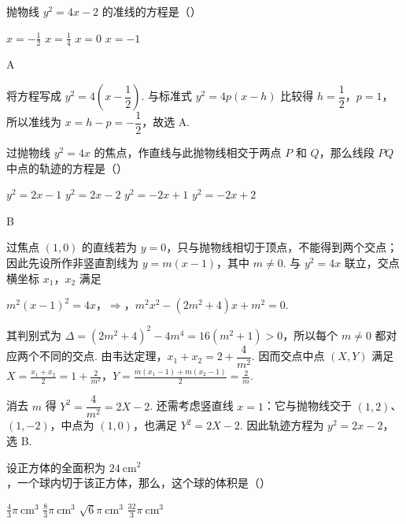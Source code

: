 \documentclass[UTF8,a4paper,oneside,11pt]{ctexbook}
\begin{document}
\begin{problem}
抛物线 \(y^2 = 4x - 2\) 的准线的方程是（\quad）

\choices
    {\(x = -\frac{1}{2}\)}
    {\(x = \frac{1}{4}\)}
    {\(x = 0\)}
    {\(x = -1\)}
\end{problem}

\begin{answer}
A
\end{answer}

\begin{solution}
将方程写成 \(y^2=4\left(x-\dfrac12\right)\). 与标准式 \(y^2=4p(x-h)\) 比较得 \(h=\dfrac12\)，\(p=1\)，所以准线为 \(x=h-p=-\dfrac12\)，故选 A.
\end{solution}

\begin{problem}
过抛物线 \(y^2 = 4x\) 的焦点，作直线与此抛物线相交于两点 \(P\) 和 \(Q\)，那么线段 \(PQ\) 中点的轨迹的方程是（\quad）

\choices
    {\(y^2 = 2x - 1\)}
    {\(y^2 = 2x - 2\)}
    {\(y^2 = -2x + 1\)}
    {\(y^2 = -2x + 2\)}
\end{problem}

\begin{answer}
B
\end{answer}

\begin{solution}
过焦点 \((1,0)\) 的直线若为 \(y=0\)，只与抛物线相切于顶点，不能得到两个交点；因此先设所作非竖直割线为 \(y=m(x-1)\)，其中 \(m\ne0\). 与 \(y^2=4x\) 联立，交点横坐标 \(x_1\)，\(x_2\) 满足

\(m^2(x-1)^2=4x\)，\(\Longrightarrow\)，\(m^2x^2-(2m^2+4)x+m^2=0\).

其判别式为 \(\Delta=(2m^2+4)^2-4m^4=16(m^2+1)>0\)，所以每个 \(m\ne0\) 都对应两个不同的交点. 由韦达定理，\(x_1+x_2=2+\dfrac4{m^2}\). 因而交点中点 \((X,Y)\) 满足 \(X=\frac{x_1+x_2}{2}=1+\frac2{m^2}\)，\(Y=\frac{m(x_1-1)+m(x_2-1)}2=\frac2m\).

消去 \(m\) 得 \(Y^2=\dfrac4{m^2}=2X-2\). 还需考虑竖直线 \(x=1\)：它与抛物线交于 \((1,2)\)、\((1,-2)\)，中点为 \((1,0)\)，也满足 \(Y^2=2X-2\). 因此轨迹方程为 \(y^2=2x-2\)，选 B.
\end{solution}

\begin{problem}
设正方体的全面积为 \(24\mathrm{~cm}^2\)，一个球内切于该正方体，那么，这个球的体积是（\quad）

\choices
    {\(\frac{4}{3}\pi\mathrm{~cm}^3\)}
    {\(\frac{8}{3}\pi\mathrm{~cm}^3\)}
    {\(\sqrt{6}\pi\mathrm{~cm}^3\)}
    {\(\frac{32}{3}\pi\mathrm{~cm}^3\)}
\end{problem}
\end{document}

